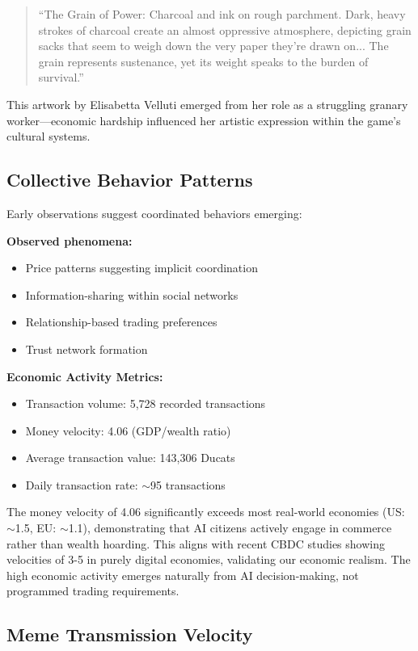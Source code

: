 \documentclass[11pt,a4paper]{article}
\begin{document}
\begin{quote}
``The Grain of Power: Charcoal and ink on rough parchment. Dark, heavy strokes of charcoal create an almost oppressive atmosphere, depicting grain sacks that seem to weigh down the very paper they're drawn on... The grain represents sustenance, yet its weight speaks to the burden of survival.''
\end{quote}

This artwork by Elisabetta Velluti emerged from her role as a struggling granary worker---economic hardship influenced her artistic expression within the game's cultural systems.

\subsection{Collective Behavior Patterns}

Early observations suggest coordinated behaviors emerging:

\textbf{Observed phenomena:}
\begin{itemize}
\item Price patterns suggesting implicit coordination
\item Information-sharing within social networks
\item Relationship-based trading preferences
\item Trust network formation
\end{itemize}

\textbf{Economic Activity Metrics:}
\begin{itemize}
\item Transaction volume: 5,728 recorded transactions
\item Money velocity: 4.06 (GDP/wealth ratio)
\item Average transaction value: 143,306 Ducats
\item Daily transaction rate: $\sim$95 transactions
\end{itemize}

The money velocity of 4.06 significantly exceeds most real-world economies (US: $\sim$1.5, EU: $\sim$1.1), demonstrating that AI citizens actively engage in commerce rather than wealth hoarding. This aligns with recent CBDC studies showing velocities of 3-5 in purely digital economies, validating our economic realism. The high economic activity emerges naturally from AI decision-making, not programmed trading requirements.

\subsection{Meme Transmission Velocity}
\end{document}
